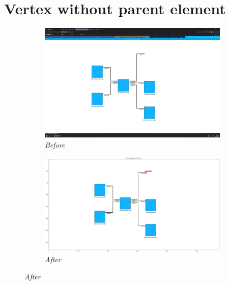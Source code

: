 \documentclass{article}
\begin{document}
\section{Vertex without parent element}
\begin{figure}[H]
    \centering
    \begin{subfigure}[t]{0.9\textwidth}
        \centering
        \includegraphics[width=\textwidth]{testcases/vertex_without_parent/140908-928722_input_image.png}
        \caption*{\textit{Before}}
    \end{subfigure}
    \newline
    \begin{subfigure}[t]{0.9\textwidth}
        \centering
        \includegraphics[width=\textwidth]{testcases/vertex_without_parent/140928-590960_element_bbox_errors_labeled_colored.png}
        \caption*{\textit{After}}
    \end{subfigure}
    \label{fig:vertex_without_parent}
\end{figure}
\newpage
\end{document}
